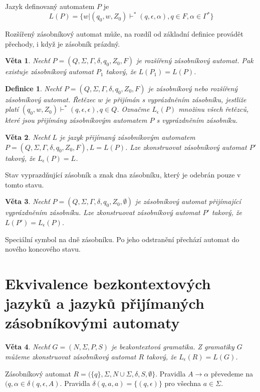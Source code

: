 \documentclass[a4paper, 11pt]{report}
\newtheorem{mydef}{Definice}[chapter]
\newtheorem{veta}{Věta}[chapter]
\begin{document}
Jazyk definovaný automatem $P$ je
$$L(P) = \{w | (q_0, w, Z_0) \vdash^* (q, \epsilon, \alpha), q \in F, \alpha \in \Gamma^*\}$$

Rozšířený zásobníkový automat může, na rozdíl od základní definice provádět přechody, i když je zásobník prázdný.

\begin{veta}
Nechť $P = (Q, \Sigma, \Gamma, \delta, q_0, Z_0, F)$ je rozšířený zásobníkový automat. Pak existuje zásobníkový automat $P_1$ takový, že $L(P_1) = L(P)$.
\end{veta}

\begin{mydef}
Nechť $P = (Q, \Sigma, \Gamma, \delta, q_0, Z_0, F)$ je zásobníkový nebo rozšířený zásobníkový automat. Řetězec $w$ je přijímán s \emph{vyprázdněním zásobníku}, jestliže platí $(q_0, w, Z_0) \vdash^* (q, \epsilon, \epsilon), q \in Q$. Označme $L_\epsilon(P)$ množinu všech řetězců, které jsou přijímány zásobníkovým automatem $P$ s vyprázdněním zásobníku.
\end{mydef}

\begin{veta}
Nechť $L$ je jazyk přijímaný zásobníkovým automatem $P = (Q, \Sigma, \Gamma, \delta, q_0, Z_0, F), L = L(P)$. Lze zkonstruovat zásobníkový automat $P'$ takový, že $L_\epsilon(P) = L$.
\end{veta}
Stav vyprazdňující zásobník a znak dna zásobníku, který je odebrán pouze v tomto stavu.

\begin{veta}
Nechť $P = (Q, \Sigma, \Gamma, \delta, q_0, Z_0, \emptyset)$ je zásobníkový automat přijímající vyprázdněním zásobníku. Lze zkonstruovat zásobníkový automat $P'$ takový, že $L(P') = L_\epsilon(P)$.
\end{veta}
Speciální symbol na dně zásobníku. Po jeho odstranění přechází automat do nového koncového stavu.

\section{Ekvivalence bezkontextových jazyků a jazyků přijímaných zásobníkovými automaty}

\begin{veta}
Nechť $G = (N, \Sigma, P, S)$ je bezkontextová gramatika. Z gramatiky $G$ můžeme zkonstruovat zásobníkový automat $R$ takový, že $L_\epsilon(R) = L(G)$.
\end{veta}

Zásobníkový automat $R = (\{q\}, \Sigma, N \cup \Sigma, \delta, S, \emptyset\}$. Pravidla $A \to \alpha$ převedeme na $(q, \alpha \in \delta(q, \epsilon, A)$. Pravidla $\delta(q, a, a) = \{(q, \epsilon)\}$ pro všechna $a \in \Sigma$.
\end{document}
